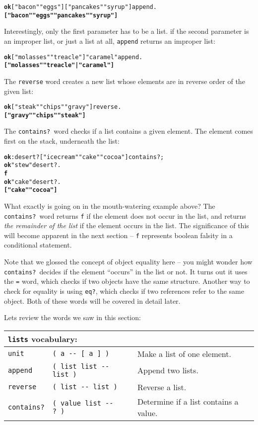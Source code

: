 \documentclass[english]{book}
\newcommand{\wordtable}[1]{{
\begin{tabularx}{12cm}{|l l X|}
#1
\hline
\end{tabularx}}}
\newcommand{\tabvocab}[1]{
\hline
\multicolumn{3}{|l|}{
\rule[-2mm]{0mm}{6mm}
\texttt{#1} vocabulary:}
\\
\hline
}
\begin{document}
\begin{alltt}
\textbf{ok} {[} "bacon" "eggs" {]} {[} "pancakes" "syrup" {]} append .
\textbf{{[} "bacon" "eggs" "pancakes" "syrup" {]}}
\end{alltt}

Interestingly, only the first parameter has to be a list. if the second parameter
is an improper list, or just a list at all, \texttt{append} returns an improper list:

\begin{alltt}
\textbf{ok} {[} "molasses" "treacle" {]} "caramel" append .
\textbf{{[} "molasses" "treacle" | "caramel" {]}}
\end{alltt}

The \texttt{reverse} word creates a new list whose elements are in reverse order of the given list:

\begin{alltt}
\textbf{ok} {[} "steak" "chips" "gravy" {]} reverse .
\textbf{{[} "gravy" "chips" "steak" {]}}
\end{alltt}

The \texttt{contains?}~word checks if a list contains a given element. The element comes first on the stack, underneath the list:

\begin{alltt}
\textbf{ok} : desert? {[} "ice cream" "cake" "cocoa" {]} contains? ;
\textbf{ok} "stew" desert? .
\textbf{f}
\textbf{ok} "cake" desert? .
\textbf{{[} "cake" "cocoa" {]}}
\end{alltt}

What exactly is going on in the mouth-watering example above? The \texttt{contains?}~word returns \texttt{f} if the element does not occur in the list, and returns \emph{the remainder of the list} if the element occurs in the list. The significance of this will become apparent in the next section -- \texttt{f} represents boolean falsity in a conditional statement.

Note that we glossed the concept of object equality here -- you might wonder how \texttt{contains?}~decides if the element ``occurs'' in the list or not. It turns out it uses the \texttt{=} word, which checks if two objects have the same structure. Another way to check for equality is using \texttt{eq?}, which checks if two references refer to the same object. Both of these words will be covered in detail later.

Lets review the words we saw in this section:

\wordtable{
\tabvocab{lists}
\texttt{unit}&
\texttt{( a -{}- {[} a {]} )}&
Make a list of one element.\\
\texttt{append}&
\texttt{( list list -{}- list )}&
Append two lists.\\
\texttt{reverse}&
\texttt{( list -{}- list )}&
Reverse a list.\\
\texttt{contains?}&
\texttt{( value list -{}- ?~)}&
Determine if a list contains a value.\\}
\end{document}
